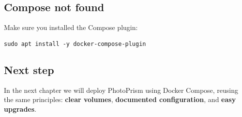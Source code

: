 \subsection{Compose not found}
Make sure you installed the Compose plugin:
\begin{lstlisting}
sudo apt install -y docker-compose-plugin
\end{lstlisting}

\subsection{Next step}
In the next chapter we will deploy PhotoPrism using Docker Compose, reusing the same principles:
\textbf{clear volumes}, \textbf{documented configuration}, and \textbf{easy upgrades}.